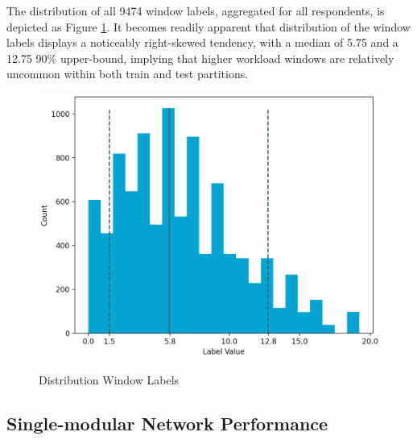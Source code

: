 \documentclass[12pt]{article}
\begin{document}
The distribution of all 9474 window labels, aggregated for all respondents,  is depicted as Figure \ref{fig:labels}. It becomes readily apparent that distribution of the window labels displays a noticeably right-skewed tendency, with a median of 5.75 and a 12.75 90\% upper-bound, implying that higher workload windows are relatively uncommon within both train and test partitions.  
\vspace{0.2cm}

\begin{figure}[h]
\caption{Distribution Window Labels}
\includegraphics[scale=0.42]{labels.png}
\label{fig:labels}
\end{figure}

\subsection{Single-modular Network Performance}
\end{document}
